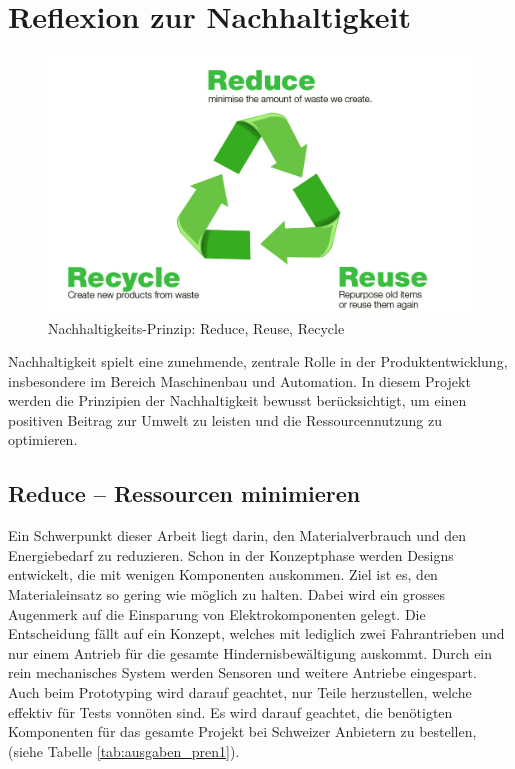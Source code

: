 \documentclass[../main.tex]{subfiles}
\begin{document}
\newpage
\section{Reflexion zur Nachhaltigkeit} \label{sec:nachhaltigkeit}

\begin{figure}[H] %
    \centering
        \includegraphics[width=0.7\linewidth]{img/nachhaltigkeit/3R-reduce-reuse-recycle.jpg}
        \caption[Nachhaltigkeits-Prinzip: Reduce, Reuse, Recycle]{Nachhaltigkeits-Prinzip: Reduce, Reuse, Recycle \footnotemark}
        
        \label{fig:3R}
    \end{figure} 


Nachhaltigkeit spielt eine zunehmende, zentrale Rolle in der Produktentwicklung, insbesondere im Bereich Maschinenbau und Automation. In diesem Projekt werden die Prinzipien der Nachhaltigkeit bewusst berücksichtigt, um einen positiven Beitrag zur Umwelt zu leisten und die Ressourcennutzung zu optimieren.

\subsection{Reduce – Ressourcen minimieren}

Ein Schwerpunkt dieser Arbeit liegt darin, den Materialverbrauch und den Energiebedarf zu reduzieren. Schon in der Konzeptphase werden Designs entwickelt, die mit wenigen Komponenten auskommen. Ziel ist es, den Materialeinsatz so gering wie möglich zu halten. Dabei wird ein grosses Augenmerk auf die Einsparung von Elektrokomponenten gelegt. Die Entscheidung fällt auf ein Konzept, welches mit lediglich zwei Fahrantrieben und nur einem Antrieb für die gesamte Hindernisbewältigung auskommt. Durch ein rein mechanisches System werden Sensoren und weitere Antriebe eingespart. Auch beim Prototyping wird darauf geachtet, nur Teile herzustellen, welche effektiv für Tests vonnöten sind. Es wird darauf geachtet, die benötigten Komponenten für das gesamte Projekt bei Schweizer Anbietern zu bestellen, (siehe Tabelle \ref{tab:ausgaben_pren1}).
\end{document}
